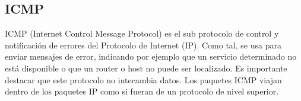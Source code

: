 \documentclass[a4paper,spanish,12pt]{article}
\begin{document}
\subsection{ICMP}
\indent ICMP (Internet Control Message Protocol) es el sub protocolo de control
y notificación de errores del Protocolo de Internet (IP). Como tal, se usa para
enviar mensajes de error, indicando por ejemplo que un servicio determinado no
está disponible o que un router o host no puede ser localizado. Es importante
destacar que este protocolo no intecambia datos. Los paquetes ICMP viajan dentro
de los paquetes IP como si fueran de un protocolo de nivel superior. 



\newpage




 
\end{document}
